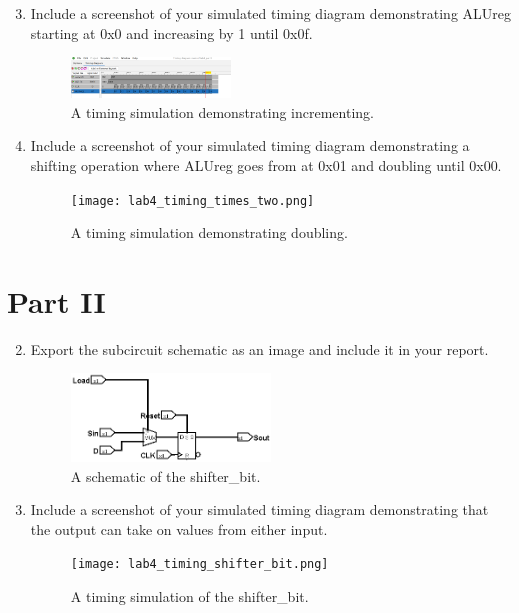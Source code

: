 \documentclass{article}
\begin{document}
\begin{enumerate}
\setcounter{enumi}{2}
\item Include a screenshot of your simulated timing diagram demonstrating ALUreg starting at 0x0 and increasing by 1 until 0x0f.

\begin{figure}[ht!]
    \centering
    \includegraphics[width=0.4\textwidth]{lab4_timing_plus_one.png}
    \caption{A timing simulation demonstrating incrementing.}
    \label{f:timing_plus_one}
\end{figure}

\item Include a screenshot of your simulated timing diagram demonstrating a shifting operation where ALUreg goes from at 0x01 and doubling until 0x00.

\begin{figure}[ht!]
    \centering
    \texttt{[image: lab4\_timing\_times\_two.png]}
    \caption{A timing simulation demonstrating doubling.}
    \label{f:timing_double}
\end{figure}
\end{enumerate}

\section*{Part II}

\begin{enumerate}
\setcounter{enumi}{1}
\item Export the subcircuit schematic as an image and include it in your report.

\begin{figure}[ht!]
    \centering
    \includegraphics[width=0.5\textwidth]{lab4_shifter_bit.png}
    \caption{A schematic of the shifter\_bit.}
    \label{f:shifter_bit}
\end{figure}

\item Include a screenshot of your simulated timing diagram demonstrating that the output can take on values from either input.

\begin{figure}[ht!]
    \centering
    \texttt{[image: lab4\_timing\_shifter\_bit.png]}
    \caption{A timing simulation of the shifter\_bit.}
    \label{f:timing_shifter_bit}
\end{figure}
\end{enumerate}
\end{document}
